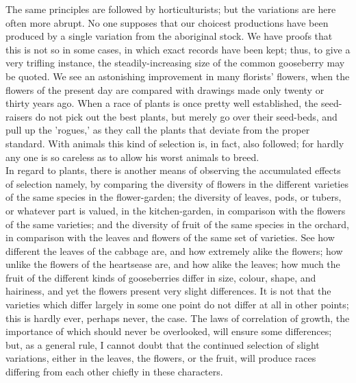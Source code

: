 \indent The same principles are followed by horticulturists; but the variations are here often more abrupt. No one supposes that our choicest productions have been produced by a single variation from the aboriginal stock. We have proofs that this is not so in some cases, in which exact records have been kept; thus, to give a very trifling instance, the steadily-increasing size of the common gooseberry may be quoted. We see an astonishing improvement in many florists' flowers, when the flowers of the present day are compared with drawings made only twenty or thirty years ago. When a race of plants is once pretty well established, the seed-raisers do not pick out the best plants, but merely go over their seed-beds, and pull up the 'rogues,' as they call the plants that deviate from the proper standard. With animals this kind of selection is, in fact, also followed; for hardly any one is so careless as to allow his worst animals to breed.  \\
\indent In regard to plants, there is another means of observing the accumulated effects of selection namely, by comparing the diversity of flowers in the different varieties of the same species in the flower-garden; the diversity of leaves, pods, or tubers, or whatever part is valued, in the kitchen-garden, in comparison with the flowers of the same varieties; and the diversity of fruit of the same species in the orchard, in comparison with the leaves and flowers of the same set of varieties. See how different the leaves of the cabbage are, and how extremely alike the flowers; how unlike the flowers of the heartsease are, and how alike the leaves; how much the fruit of the different kinds of gooseberries differ in size, colour, shape, and hairiness, and yet the flowers present very slight differences. It is not that the varieties which differ largely in some one point do not differ at all in other points; this is hardly ever, perhaps never, the case. The laws of correlation of growth, the importance of which should never be overlooked, will ensure some differences; but, as a general rule, I cannot doubt that the continued selection of slight variations, either in the leaves, the flowers, or the fruit, will produce races differing from each other chiefly in these characters.  \\

